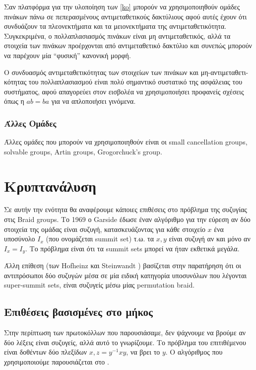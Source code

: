 Σαν πλατφόρμα για την υλοποίηση των \ref{ko} μπορούν να χρησιμοποιηθούν ομάδες πινάκων πάνω σε πεπερασμένους αντιμεταθετικούς δακτύλιους αφού αυτές έχουν ότι συνδυάζουν τα πλεονεκτήματα και τα μειονεκτήματα της αντιμεταθετικότητα. Συγκεκριμένα, ο πολλαπλασιασμός πινάκων είναι μη αντιμεταθετικός, αλλά τα στοιχεία των πινάκων προέρχονται από αντιμεταθετικό δακτύλιο και συνεπώς μπορούν να παρέχουν μία ``φυσική'' κανονική μορφή.

Ο συνδυασμός αντιμεταθετικότητας των στοιχείων των πινάκων και μη-αντιμεταθετι-κότητας του πολλαπλασιασμού είναι πολύ σημαντικό συστατικό της ασφάλειας του συστήματος, αφού απαγορεύει στον εισβολέα να χρησιμοποιήσει προφανείς σχέσεις όπως η $ ab=ba $ για να απλοποιήσει γινόμενα.

\subsubsection{Άλλες Ομάδες}

Άλλες ομάδες που μπορούν να χρησιμοποιηθούν είναι οι small cancellation groups, solvable groups, Artin groups, Grogorchuck's group.



\section{Κρυπτανάλυση}
Σε αυτήν την ενότητα θα αναφέρουμε κάποιες επιθέσεις στο πρόβλημα της συζυγίας στις Braid groups. Το 1969 ο Garside \cite{attack} έδωσε έναν αλγόριθμο για την εύρεση αν δύο στοιχεία της ομάδας είναι συζυγή, κατασκευάζοντας για κάθε στοιχείο $x$ ένα υποσύνολο $I_x$ (που ονομάζεται summit set) τ.ω. τα $x,y $ είναι συζυγή αν και μόνο αν $I_x=I_y$. Το πρόβλημα είναι ότι τα summit sets μπορεί να ήταν εκθετικά μεγάλα.

Άλλη επίθεση (των Hofheinz και Steinwandt \cite{Hattack}) βασίζεται στην παρατήρηση ότι οι αντιπρόσωποι δύο συζυγών μέσα σε μία ειδική κατηγορία υποσυνόλων που λέγονται super-summit sets, είναι συζυγείς μέσω μίας permutation braid.

\subsection{Επιθέσεις βασισμένες στο μήκος}
\label{analysis}
Στην περίπτωση των πρωτοκόλλων που παρουσιάσαμε, δεν ψάχνουμε να βρούμε αν δύο λέξεις είναι συζυγείς, αλλά αυτό το γνωρίζουμε. Το πρόβλημα του επιτιθέμενου είναι δοθέντων δύο πλεξίδων $x, z=y^{-1}xy$, να βρει το $y$. Ο αλγόριθμος που χρησιμοποιούμε παρουσιάζεται στο \cite{length-basedattacks}.

